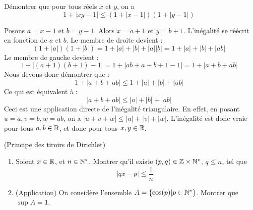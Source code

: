 \documentclass[solutions]{exercices}
\begin{document}
\begin{exercice}[\st]
	Démontrer que pour tous réels $x$ et $y$, on a
	\[ 1 + |xy - 1| \leq (1 + |x - 1|)(1 + |y - 1|) \]
\end{exercice}

\begin{solution}
	Posons $a = x-1$ et $b=y-1$. Alors $x=a+1$ et $y=b+1$.
	L'inégalité se réécrit en fonction de $a$ et $b$.
	Le membre de droite devient :
	\[ (1+|a|)(1+|b|) = 1 + |a| + |b| + |a||b| = 1 + |a| + |b| + |ab| \]
	Le membre de gauche devient :
	\[ 1 + |(a+1)(b+1)-1| = 1 + |ab+a+b+1-1| = 1+|a+b+ab| \]
	Nous devons donc démontrer que :
	\[ 1+|a+b+ab| \leq 1+|a|+|b|+|ab| \]
	Ce qui est équivalent à :
	\[ |a+b+ab| \leq |a|+|b|+|ab| \]
	Ceci est une application directe de l'inégalité triangulaire. En effet, en posant $u=a, v=b, w=ab$, on a $|u+v+w| \leq |u|+|v|+|w|$.
	L'inégalité est donc vraie pour tous $a, b \in \mathbb{R}$, et donc pour tous $x, y \in \mathbb{R}$.
\end{solution}


\begin{exercice}[\st] (Principe des tiroirs de Dirichlet)
	\begin{enumerate}
		\item Soient $x \in \mathbb{R}$, et $n \in \mathbb{N}^*$. Montrer qu'il existe $(p, q) \in \mathbb{Z} \times \mathbb{N}^*$, $q \leq n$, tel que
		      \[ |qx - p| \leq \frac{1}{n} \]
		\item (Application) On considère l'ensemble $A = \{\cos(p)|p\in \mathbb{N}^*\}$. Montrer que $\sup A = 1$.
	\end{enumerate}
\end{exercice}
\end{document}
